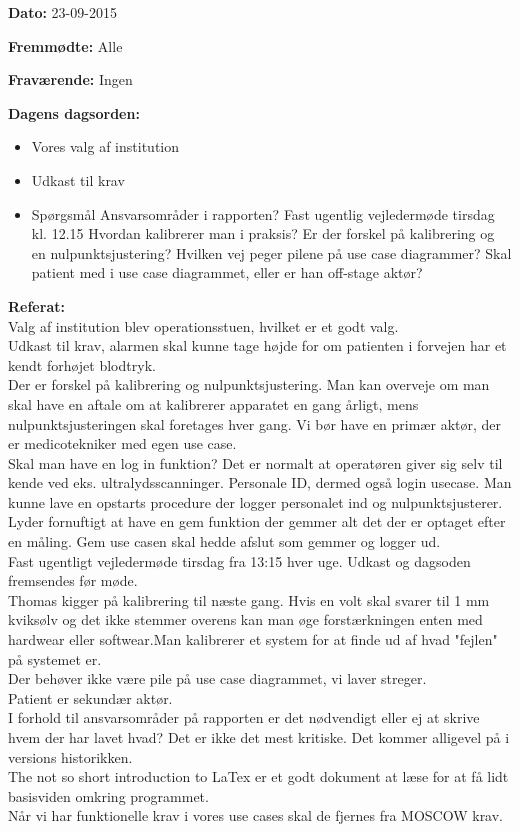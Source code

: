 \textbf{Dato:} 23-09-2015

\textbf{Fremmødte:} Alle

\textbf{Fraværende:} Ingen

\textbf{Dagens dagsorden:}
\begin{itemize}
	\item Vores valg af institution
	\item Udkast til krav
	\item Spørgsmål
	\subitem Ansvarsområder i rapporten?
	\subitem Fast ugentlig vejledermøde tirsdag kl. 12.15
	\subitem Hvordan kalibrerer man i praksis?
	\subitem Er der forskel på kalibrering og en nulpunktsjustering?
	\subitem Hvilken vej peger pilene på use case diagrammer?
	\subitem Skal patient med i use case diagrammet, eller er han off-stage aktør?
\end{itemize}

\textbf{Referat:}
\\Valg af institution blev operationsstuen, hvilket er et godt valg. 
\\Udkast til krav, alarmen skal kunne tage højde for om patienten i forvejen har et kendt forhøjet blodtryk.
\\Der er forskel på kalibrering og nulpunktsjustering. Man kan overveje om man skal have en aftale om at kalibrerer apparatet en gang årligt, mens nulpunktsjusteringen skal foretages hver gang. Vi bør have en primær aktør, der er medicotekniker med egen use case. 
\\Skal man have en log in funktion? Det er normalt at operatøren giver sig selv til kende ved eks. ultralydsscanninger. Personale ID, dermed også login usecase. Man kunne lave en opstarts procedure der logger personalet ind og nulpunktsjusterer.
\\Lyder fornuftigt at have en gem funktion der gemmer alt det der er optaget efter en måling. Gem use casen skal hedde afslut som gemmer og logger ud.
\\Fast ugentligt vejledermøde tirsdag fra 13:15 hver uge. Udkast og dagsoden fremsendes før møde.
\\Thomas kigger på kalibrering til næste gang. Hvis en volt skal svarer til 1 mm kviksølv og det ikke stemmer overens kan man øge forstærkningen enten med hardwear eller softwear.Man kalibrerer et system for at finde ud af hvad "fejlen" på systemet er.
\\Der behøver ikke være pile på use case diagrammet, vi laver streger.
\\Patient er sekundær aktør.
\\I forhold til ansvarsområder på rapporten er det nødvendigt eller ej at skrive hvem der har lavet hvad? Det er ikke det mest kritiske. Det kommer alligevel på i versions historikken.
\\The not so short introduction to LaTex er et godt dokument at læse for at få lidt basisviden omkring programmet.
\\Når vi har funktionelle krav i vores use cases skal de fjernes fra MOSCOW krav.